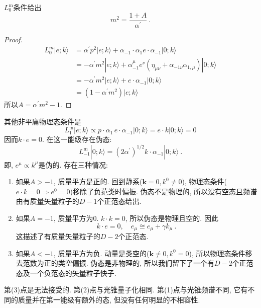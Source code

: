 $L_{0}^{\mathrm{m}}$条件给出
\begin{equation}
m^{2}=\frac{1+A}{\alpha^{\prime}} \:. \label{4.1.16}
\end{equation}
\begin{tcolorbox}
	\begin{proof}
		\begin{align*}
		L_{0}^{m}|e; k\rangle&=\alpha^{\prime} p^{2}|e ; k\rangle+\alpha_{-1} \cdot \alpha_{1} e \cdot \alpha_{-1}|0 ; k\rangle \\
		&=-\alpha^{\prime} m^{2} |e; k\rangle+\alpha_{-1}^{\mu} e^{\nu}(\eta_{\mu \nu}+\alpha_{-1\nu}\alpha_{1, \mu})|0 ; k\rangle \\
		&=-\alpha^{\prime} m^{2} |e; k\rangle+e \cdot \alpha_{-1} |0; k\rangle \\
		&=(1-\alpha^{\prime} m^{2})|e; k\rangle
		\end{align*}
		所以$A=\alpha^{\prime} m^{2}-1$.
	\end{proof}
\end{tcolorbox}
\noindent
其他非平庸物理态条件是
\begin{equation}
L_{1}^{\mathrm{m}}|e ; k\rangle \propto p \cdot \alpha_{1} \, e \cdot \alpha_{-1}|0 ; k\rangle=e \cdot k|0 ; k\rangle=0 \label{4.1.17}
\end{equation}
因而$k \cdot e=0$. 在这一能级存在伪态:
\begin{equation}
L_{-1}^{\mathrm{m}}|0 ; k\rangle=(2 \alpha^{\prime})^{1 / 2} k \cdot \alpha_{-1}|0 ; k\rangle \:. \label{4.1.18}
\end{equation}
即,  $e^{\mu} \propto k^{\mu}$是伪的. 存在三种情况: 
\begin{enumerate}
	\item 
	如果$A>-1$, 质量平方是正的. 回到静系($\mathbf{k}=0, k^{0} \neq 0$), 物理态条件($e \cdot k=0  \Rightarrow e^{0}=0$)移除了负范类时偏振. 伪态不是物理的, 所以没有空态且频谱由有质量矢量粒子的$D-1$个正范态给出.
	\item 如果$A=-1$, 质量平方为0. $k \cdot k=0$, 所以伪态是物理且空的. 因此
	\begin{equation}
	k \cdot e=0, \quad e_{\mu} \cong e_{\mu}+\gamma k_{\mu} \:. \label{4.1.19}
	\end{equation}
	这描述了有质量矢量粒子的$D-2$个正范态.
	\item 
	如果$A<-1$, 质量平方为负. 动量是类空的($\mathbf{k} \neq 0, k^{0} = 0$), 所以物理态条件移去范数为正的类空偏振. 伪态是非物理的, 所以我们留下了一个有$D-2$个正范态及一个负范态的矢量粒子快子.
\end{enumerate}
第(3)点是无法接受的. 第(2)点与光锥量子化相同. 第(1)点与光锥频谱不同, 它有不同的质量并在第一能级有额外的态, 但没有任何明显的不相容性. 

